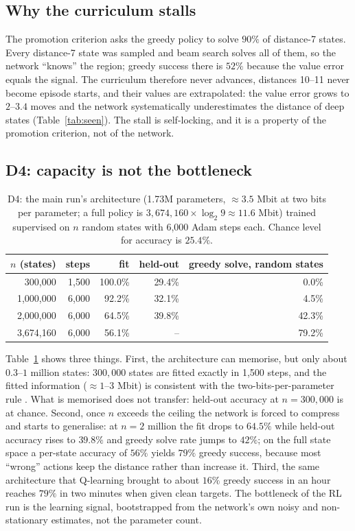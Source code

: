 \documentclass[11pt]{article}
\begin{document}
\subsection{Why the curriculum stalls}

The promotion criterion asks the greedy policy to solve $90\%$ of distance-7 states. Every
distance-7 state was sampled and beam search solves all of them, so the network ``knows'' the
region; greedy success there is $52\%$ because the value error equals the signal. The
curriculum therefore never advances, distances 10--11 never become episode starts, and their
values are extrapolated: the value error grows to $2$--$3.4$ moves and the network
systematically underestimates the distance of deep states (Table~\ref{tab:seen}). The stall is
self-locking, and it is a property of the promotion criterion, not of the network.

\subsection{D4: capacity is not the bottleneck}

\begin{table}[t]
\centering\small
\caption{D4: the main run's architecture (1.73M parameters, $\approx3.5$ Mbit at two bits per
parameter; a full policy is $3{,}674{,}160\times\log_2 9 \approx 11.6$ Mbit) trained supervised on
$n$ random states with 6{,}000 Adam steps each. Chance level for accuracy is $25.4\%$.}
\label{tab:cap}
\begin{tabular}{rrrrr}
\toprule
$n$ (states) & steps & fit & held-out & greedy solve, random states \\
\midrule
300{,}000   & 1{,}500 & 100.0\% & 29.4\% & 0.0\% \\
1{,}000{,}000 & 6{,}000 & 92.2\% & 32.1\% & 4.5\% \\
2{,}000{,}000 & 6{,}000 & 64.5\% & 39.8\% & 42.3\% \\
3{,}674{,}160 & 6{,}000 & 56.1\% & -- & 79.2\% \\
\bottomrule
\end{tabular}
\end{table}

Table~\ref{tab:cap} shows three things. First, the architecture can memorise, but only about
$0.3$--$1$ million states: $300{,}000$ states are fitted exactly in 1{,}500 steps, and the
fitted information ($\approx1$--$3$ Mbit) is consistent with the two-bits-per-parameter
rule \citep{allenzhu2024}. What is memorised does not transfer: held-out accuracy at
$n=300{,}000$ is at chance. Second, once $n$ exceeds the ceiling the network is forced to
compress and starts to generalise: at $n=2$ million the fit drops to $64.5\%$ while held-out
accuracy rises to $39.8\%$ and greedy solve rate jumps to $42\%$; on the full state space a
per-state accuracy of $56\%$ yields $79\%$ greedy success, because most ``wrong'' actions keep
the distance rather than increase it. Third, the same architecture that Q-learning brought to
about $16\%$ greedy success in an hour reaches $79\%$ in two minutes when given clean targets.
The bottleneck of the RL run is the learning signal, bootstrapped from the network's own
noisy and non-stationary estimates, not the parameter count.
\end{document}
